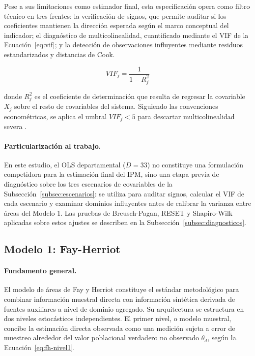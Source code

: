 Pese a sus limitaciones como estimador final, esta especificación opera como filtro técnico en tres frentes: la verificación de signos, que permite auditar si los coeficientes mantienen la dirección esperada según el marco conceptual del indicador; el diagnóstico de multicolinealidad, cuantificado mediante el VIF de la Ecuación~\ref{eq:vif}; y la detección de observaciones influyentes mediante residuos estandarizados y distancias de Cook.

\begin{equation}
    VIF_j = \frac{1}{1 - R^2_j}
    \label{eq:vif}
\end{equation}

\noindent donde $R^2_j$ es el coeficiente de determinación que resulta de regresar la covariable $X_j$ sobre el resto de covariables del sistema. Siguiendo las convenciones econométricas, se aplica el umbral $VIF_j < 5$ para descartar multicolinealidad severa \cite{Greene_2018}.

\paragraph{Particularización al trabajo.}
En este estudio, el OLS departamental ($D=33$) no constituye una formulación competidora para la estimación final del IPM, sino una etapa previa de diagnóstico sobre los tres escenarios de covariables de la Subsección~\ref{subsec:escenarios}: se utiliza para auditar signos, calcular el VIF de cada escenario y examinar dominios influyentes antes de calibrar la varianza entre áreas del Modelo 1. Las pruebas de Breusch-Pagan, RESET y Shapiro-Wilk aplicadas sobre estos ajustes se describen en la Subsección~\ref{subsec:diagnosticos}.

\subsection{Modelo 1: Fay-Herriot}
\label{subsec:fay-herriot}

\paragraph{Fundamento general.}
El modelo de áreas de Fay y Herriot \cite{FayHerriot_1979} constituye el estándar metodológico para combinar información muestral directa con información sintética derivada de fuentes auxiliares a nivel de dominio agregado. Su arquitectura se estructura en dos niveles estocásticos independientes. El primer nivel, o modelo muestral, concibe la estimación directa observada como una medición sujeta a error de muestreo alrededor del valor poblacional verdadero no observado $\theta_d$, según la Ecuación~\ref{eq:fh-nivel1}.


